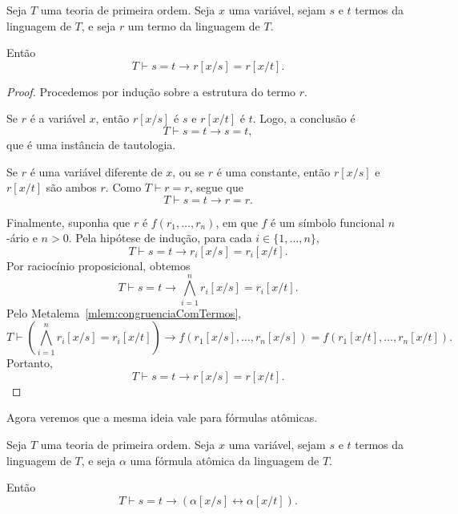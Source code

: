 \begin{metalemma}\label{mlem:substituicaoIguaisTermos}
    Seja $T$ uma teoria de primeira ordem.
    Seja $x$ uma variável, sejam $s$ e $t$ termos da linguagem de $T$, e seja $r$ um termo da linguagem de $T$.

    Então
    \[
        T\vdash s=t\rightarrow r[x/s]=r[x/t].
    \]
\end{metalemma}

\begin{proof}
    Procedemos por indução sobre a estrutura do termo $r$.

    Se $r$ é a variável $x$, então $r[x/s]$ é $s$ e $r[x/t]$ é $t$.
    Logo, a conclusão é
    \[
        T\vdash s=t\rightarrow s=t,
    \]
    que é uma instância de tautologia.

    Se $r$ é uma variável diferente de $x$, ou se $r$ é uma constante, então $r[x/s]$ e $r[x/t]$ são ambos $r$.
    Como $T\vdash r=r$, segue que
    \[
        T\vdash s=t\rightarrow r=r.
    \]

    Finalmente, suponha que $r$ é $f(r_1,\dots,r_n)$, em que $f$ é um símbolo funcional $n$-ário e $n>0$.
    Pela hipótese de indução, para cada $i\in\{1,\dots,n\}$,
    \[
        T\vdash s=t\rightarrow r_i[x/s]=r_i[x/t].
    \]
    Por raciocínio proposicional, obtemos
    \[
        T\vdash
        s=t\rightarrow
        \bigwedge_{i=1}^n r_i[x/s]=r_i[x/t].
    \]
    Pelo Metalema~\ref{mlem:congruenciaComTermos},
    \[
        T\vdash
        \left(\bigwedge_{i=1}^n r_i[x/s]=r_i[x/t]\right)
        \rightarrow
        f(r_1[x/s],\dots,r_n[x/s])
        =
        f(r_1[x/t],\dots,r_n[x/t]).
    \]
    Portanto,
    \[
        T\vdash
        s=t\rightarrow r[x/s]=r[x/t].
    \]
\end{proof}

Agora veremos que a mesma ideia vale para fórmulas atômicas.

\begin{metalemma}\label{mlem:substituicaoIguaisAtomicas}
    Seja $T$ uma teoria de primeira ordem.
    Seja $x$ uma variável, sejam $s$ e $t$ termos da linguagem de $T$, e seja $\alpha$ uma fórmula atômica da linguagem de $T$.

    Então
    \[
        T\vdash s=t\rightarrow(\alpha[x/s]\leftrightarrow\alpha[x/t]).
    \]
\end{metalemma}

